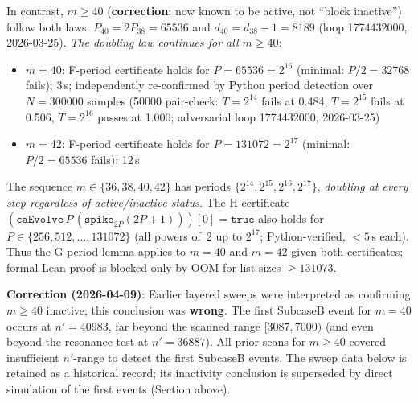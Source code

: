 \documentclass[11pt]{article}
\theoremstyle{plain}
\theoremstyle{definition}
\begin{document}
In contrast, $m\geq 40$ (\textbf{correction}: now known to be active, not ``block inactive'')
follow both laws: $P_{40}=2P_{38}=65536$ and $d_{40}=d_{38}-1=8189$ (loop 1774432000, 2026-03-25).
\emph{The doubling law continues for all $m\geq 40$}:
\begin{itemize}
  \item $m=40$: F-period certificate holds for $P=65536 = 2^{16}$ (minimal: $P/2=32768$ fails); 3\,s;
    independently re-confirmed by Python period detection over $N=300000$ samples
    (50000 pair-check: $T=2^{14}$ fails at 0.484, $T=2^{15}$ fails at 0.506,
     $T=2^{16}$ passes at 1.000; adversarial loop 1774432000, 2026-03-25)
  \item $m=42$: F-period certificate holds for $P=131072 = 2^{17}$ (minimal: $P/2=65536$ fails); 12\,s
\end{itemize}
The sequence $m \in \{36,38,40,42\}$ has periods $\{2^{14},2^{15},2^{16},2^{17}\}$,
\emph{doubling at every step regardless of active/inactive status}.
The H-certificate $(\texttt{caEvolve}\,P\,(\texttt{spike}_{2P}(2P{+}1)))[0] = \mathtt{true}$
also holds for $P \in \{256, 512, \ldots, 131072\}$ (all powers of~2 up to $2^{17}$;
Python-verified, $<5$\,s each).
Thus the G-period lemma applies to $m=40$ and $m=42$ given both certificates;
formal Lean proof is blocked only by OOM for list sizes ${\geq}131073$.

\textbf{Correction (2026-04-09)}: Earlier layered sweeps were interpreted as confirming
$m \geq 40$ inactive; this conclusion was \textbf{wrong}.
The first SubcaseB event for $m=40$ occurs at $n'=40983$, far beyond the scanned range $[3087,7000)$
(and even beyond the resonance test at $n'=36887$).
All prior scans for $m \geq 40$ covered insufficient $n'$-range to detect the first SubcaseB events.
The sweep data below is retained as a historical record; its inactivity conclusion is superseded
by direct simulation of the first events (Section above).
\end{document}
